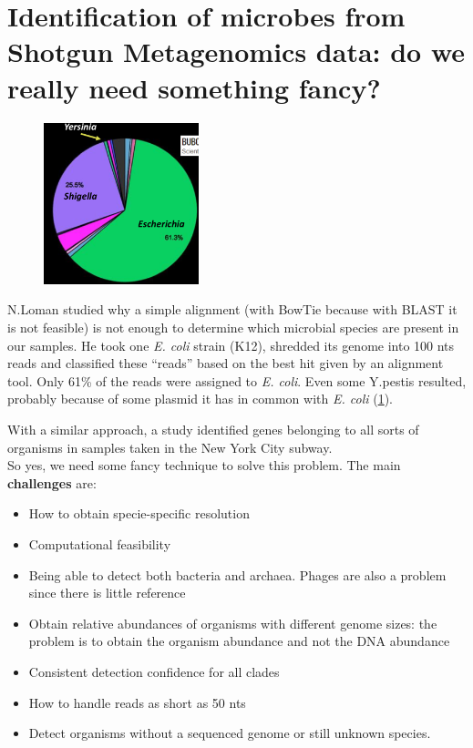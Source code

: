 \section{Identification of microbes from Shotgun Metagenomics data: do we really need something fancy?}

\begin{figure}[!h]
\centering
\includegraphics[width=0.4\textwidth]{Loman.png}
\caption{\label{fig:Loman}}
\end{figure}

 N.Loman studied why a simple alignment (with BowTie because with BLAST it is not feasible) is not enough to determine which microbial species are present in our samples. He took one \emph{E. coli} strain (K12), shredded its genome into 100 nts reads and classified these “reads” based on the best hit given by an alignment tool. Only 61\% of the reads were assigned to \emph{E. coli}. Even some Y.pestis resulted, probably because of some plasmid it has in common with \emph{E. coli} (\ref{fig:Loman}).
 
 With a similar approach, a study identified genes belonging to all sorts of organisms in samples taken in the New York City subway. \\

So yes, we need some fancy technique to solve this problem. The main \textbf{challenges} are:
\begin{itemize}
    \item How to obtain specie-specific resolution
    \item Computational feasibility
    \item Being able to detect both bacteria and archaea. Phages are also a problem since there is little reference
    \item Obtain relative abundances of organisms with different genome sizes: the problem is to obtain the organism abundance and not the DNA abundance
    \item Consistent detection confidence for all clades
    \item How to handle reads as short as 50 nts
    \item Detect organisms without a sequenced genome or still unknown species. 
\end{itemize}

